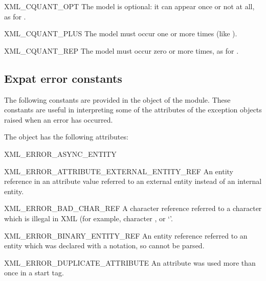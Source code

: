 \begin{datadescni}{XML_CQUANT_OPT}
The model is optional: it can appear once or not at all, as for
.
\end{datadescni}

\begin{datadescni}{XML_CQUANT_PLUS}
The model must occur one or more times (like ).
\end{datadescni}

\begin{datadescni}{XML_CQUANT_REP}
The model must occur zero or more times, as for .
\end{datadescni}


\subsection{Expat error constants \label{expat-errors}}

The following constants are provided in the  object of
the  module.  These constants are useful
in interpreting some of the attributes of the 
exception objects raised when an error has occurred.

The  object has the following attributes:

\begin{datadescni}{XML_ERROR_ASYNC_ENTITY}
\end{datadescni}

\begin{datadescni}{XML_ERROR_ATTRIBUTE_EXTERNAL_ENTITY_REF}
An entity reference in an attribute value referred to an external
entity instead of an internal entity.
\end{datadescni}

\begin{datadescni}{XML_ERROR_BAD_CHAR_REF}
A character reference referred to a character which is illegal in XML
(for example, character , or `'.
\end{datadescni}

\begin{datadescni}{XML_ERROR_BINARY_ENTITY_REF}
An entity reference referred to an entity which was declared with a
notation, so cannot be parsed.
\end{datadescni}

\begin{datadescni}{XML_ERROR_DUPLICATE_ATTRIBUTE}
An attribute was used more than once in a start tag.
\end{datadescni}

